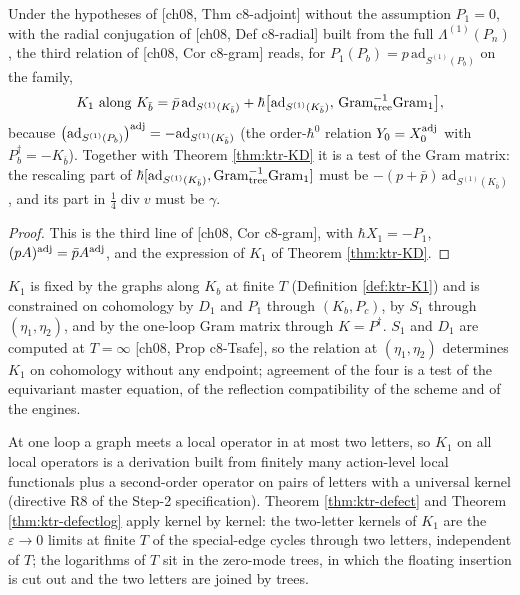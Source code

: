 \begin{corollary}[The relation $K=P^\dagger$ with $P_1\neq0$]
\label{cor:ktr-gram}
Under the hypotheses of [ch08, Thm c8-adjoint] without the assumption $P_1=0$, with the radial conjugation of [ch08, Def c8-radial] built from the full $\Lambda^{(1)}(P_n)$, the third relation of [ch08, Cor c8-gram] reads, for $P_1(P_b)=p\,\mathrm{ad}_{S^{(1)}(P_b)}$ on the family,
\[
K_1\text{ along }K_{\bar b}=\bar p\,\mathrm{ad}_{S^{(1)}(K_{\bar b})}+\hbar\big[\mathrm{ad}_{S^{(1)}(K_{\bar b})},\,\mathrm{Gram}_{\rm tree}^{-1}\mathrm{Gram}_{\rm 1}\big],
\]
because $\big(\mathrm{ad}_{S^{(1)}(P_b)}\big)^{\rm adj}=-\mathrm{ad}_{S^{(1)}(K_{\bar b})}$ (the order-$\hbar^0$ relation $Y_0=X_0^{\rm adj}$ with $P_b^\dagger=-K_{\bar b}$). Together with Theorem \ref{thm:ktr-KD} it is a test of the Gram matrix: the rescaling part of $\hbar[\mathrm{ad}_{S^{(1)}(K_{\bar b})},\mathrm{Gram}_{\rm tree}^{-1}\mathrm{Gram}_{\rm 1}]$ must be $-(p+\bar p)\,\mathrm{ad}_{S^{(1)}(K_{\bar b})}$, and its part in $\tfrac14\operatorname{div}v$ must be $\gamma$.
\end{corollary}

\begin{proof}
This is the third line of [ch08, Cor c8-gram], with $\hbar X_1=-P_1$, $(pA)^{\rm adj}=\bar pA^{\rm adj}$, and the expression of $K_1$ of Theorem \ref{thm:ktr-KD}.
\end{proof}

\begin{remark}
\label{rem:ktr-four}
$K_1$ is fixed by the graphs along $K_b$ at finite $T$ (Definition \ref{def:ktr-K1}) and is constrained on cohomology by $D_1$ and $P_1$ through $(K_b,P_c)$, by $S_1$ through $(\eta_1,\eta_2)$, and by the one-loop Gram matrix through $K=P^\dagger$. $S_1$ and $D_1$ are computed at $T=\infty$ [ch08, Prop c8-Tsafe], so the relation at $(\eta_1,\eta_2)$ determines $K_1$ on cohomology without any endpoint; agreement of the four is a test of the equivariant master equation, of the reflection compatibility of the scheme and of the engines.
\end{remark}

\begin{remark}
\label{rem:ktr-twobody}
At one loop a graph meets a local operator in at most two letters, so $K_1$ on all local operators is a derivation built from finitely many action-level local functionals plus a second-order operator on pairs of letters with a universal kernel (directive R8 of the Step-2 specification). Theorem \ref{thm:ktr-defect} and Theorem \ref{thm:ktr-defectlog} apply kernel by kernel: the two-letter kernels of $K_1$ are the $\varepsilon\to0$ limits at finite $T$ of the special-edge cycles through two letters, independent of $T$; the logarithms of $T$ sit in the zero-mode trees, in which the floating insertion is cut out and the two letters are joined by trees.
\end{remark}

